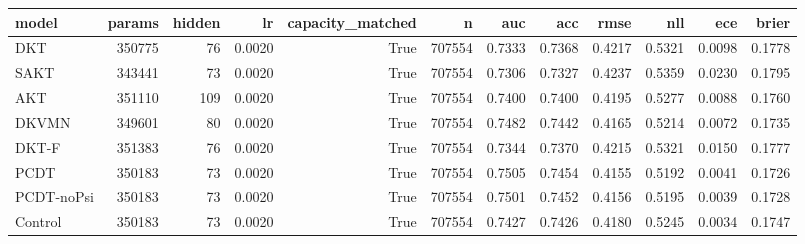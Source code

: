 \begin{tabular}{lrrrrrrrrrrr}
\toprule
model & params & hidden & lr & capacity\_matched & n & auc & acc & rmse & nll & ece & brier \\
\midrule
DKT & 350775 & 76 & 0.0020 & True & 707554 & 0.7333 & 0.7368 & 0.4217 & 0.5321 & 0.0098 & 0.1778 \\
SAKT & 343441 & 73 & 0.0020 & True & 707554 & 0.7306 & 0.7327 & 0.4237 & 0.5359 & 0.0230 & 0.1795 \\
AKT & 351110 & 109 & 0.0020 & True & 707554 & 0.7400 & 0.7400 & 0.4195 & 0.5277 & 0.0088 & 0.1760 \\
DKVMN & 349601 & 80 & 0.0020 & True & 707554 & 0.7482 & 0.7442 & 0.4165 & 0.5214 & 0.0072 & 0.1735 \\
DKT-F & 351383 & 76 & 0.0020 & True & 707554 & 0.7344 & 0.7370 & 0.4215 & 0.5321 & 0.0150 & 0.1777 \\
PCDT & 350183 & 73 & 0.0020 & True & 707554 & 0.7505 & 0.7454 & 0.4155 & 0.5192 & 0.0041 & 0.1726 \\
PCDT-noPsi & 350183 & 73 & 0.0020 & True & 707554 & 0.7501 & 0.7452 & 0.4156 & 0.5195 & 0.0039 & 0.1728 \\
Control & 350183 & 73 & 0.0020 & True & 707554 & 0.7427 & 0.7426 & 0.4180 & 0.5245 & 0.0034 & 0.1747 \\
\bottomrule
\end{tabular}
